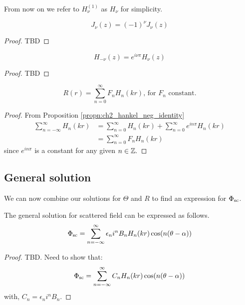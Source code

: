 From now on we refer to $H^{(1)}_\nu$ as $H_\nu$ for simplicity.
  \begin{propn}
    \[
    J_\nu(z) = (-1)^\nu J_\nu(z)
    \]
  \end{propn}
  \begin{proof}
    TBD
  \end{proof}
%
  \begin{propn}\label{propn:ch2_hankel_neg_identity}
    \[
    H_{-\nu}(z) = e^{i\nu \pi}H_\nu(z)
    \]
  \end{propn}
  \begin{proof}
    TBD
  \end{proof}
%
  \begin{propn}
    \begin{equation*}
      R(r) = \sum^\infty_{n=0} F_n H_n(kr) \text{, for $F_n$ constant.}
    \end{equation*}
  \end{propn}
  \begin{proof}
    From Proposition \ref{propn:ch2_hankel_neg_identity}
      \begin{align*}
        \sum^\infty_{n=-\infty} H_n(kr)
        & = \sum^\infty_{n=0} H_n(kr) + \sum^\infty_{n=0} e^{in\pi} H_n(kr)\\
        & = \sum^\infty_{n=0} F_n H_n(kr)
      \end{align*}
    since $e^{in\pi}$ is a constant for any given $n \in \mathbb{Z}.$
  \end{proof}
\subsection{General solution}
We can now combine our solutions for $\Theta$ and $R$ to find an expression for $\Phi_{\text{sc}}$.
%
    \begin{propn}\label{eq:gen_sol_scatterin_outside_cylinder}
      The general solution for scattered field can be expressed as follows.
        \begin{equation} \label{eq:ch2_gen_eq_scattered_field}
            \Phi_{\text{sc}} = \sum^\infty_{n=-\infty} \epsilon_n i^n B_n H_n(kr) \cos(n(\theta-\alpha))
        \end{equation}
    \end{propn}
    \begin{proof} TBD. Need to show that:
      \[
      \Phi_{\text{sc}} = \sum^\infty_{n=-\infty} C_n H_n(kr) \cos(n(\theta-\alpha))
      \]
      with, $C_n = \epsilon_n i^n B_n$.
    \end{proof}

